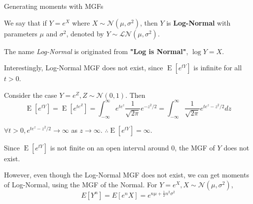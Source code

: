 \documentclass[8pt]{beamer}
\newcommand{\tb}[1]{\textbf{#1}}
\newcommand{\ti}[1]{\textit{#1}}
\newcommand{\expec}[1]{\operatorname{E}\left[ #1 \right]}
\begin{document}
\begin{frame}{Generating moments with MGFs}
    \begin{example}
        We say that if $Y = e^X$ where $X \sim \mathcal{N}(\mu, \sigma^2)$, then $Y$ is \tb{Log-Normal} with parameters $\mu$ and $\sigma^2$, denoted by $Y \sim \mathcal{LN} (\mu, \sigma^2)$.

        The name \ti{Log-Normal} is originated from \tb{"Log is Normal"}, $\log{Y} = X$.
        
        Interestingly, Log-Normal MGF does not exist, since $\expec{e^{tY}}$ is infinite for all $t> 0$.

        Consider the case $Y = e^Z, Z \sim \mathcal{N}(0, 1)$. Then
        \[
            \expec{e^{tY}} = \expec{e^{te^Z}} = \int_{-\infty}^{\infty} e^{te^z} \frac{1}{\sqrt{2\pi}} e^{-z^2 /2}  = \int_{-\infty}^{\infty} \frac{1}{\sqrt{2\pi}} e^{te^z - z^2/2} dz
        \]

        $\forall t > 0, e^{te^z - z^2 /2} \rightarrow \infty $ as $z \rightarrow \infty$. $\therefore \expec{e^{tY}} = \infty$.
        
        Since $\expec{e^{tY}}$ is not finite on an open interval around $0$, the MGF of $Y$ does not exist.

        However, even though the Log-Normal MGF does not exist, we can get moments of Log-Normal, using the MGF of the Normal.
        For $Y=e^X, X \sim \mathcal{N}(\mu, \sigma^2)$,
        \[
        E[Y^n] = E[e^nX] = e^{n\mu + \frac{1}{2}n^2 \sigma^2} 
        \]
    \end{example}
\end{frame}
\end{document}
